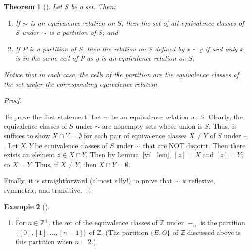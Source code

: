 \documentclass[10pt,]{book}
\theoremstyle{plain}
\newtheorem{theorem}{Theorem}[section]
\theoremstyle{definition}
\theoremstyle{definition}
\theoremstyle{definition}
\newtheorem{example}[theorem]{Example}
\theoremstyle{definition}
\numberwithin{equation}{section}
\def\Z{\mathbb{Z}}
\begin{document}
\begin{theorem}[{}]\label{part_quiv}
Let \(S\) be a set. Then: \leavevmode%
\begin{enumerate}
\item\hypertarget{li-405}{}If \(\sim\) is an equivalence relation on \(S\), then the set of all equivalence classes of \(S\) under \(\sim\) is a partition of \(S\); and%
\item\hypertarget{li-406}{}If \(P\) is a partition of \(S\), then the relation on \(S\) defined by \(x\sim y\) if and only \(x\) is in the same cell of \(P\) as \(y\) is an equivalence relation on \(S\).%
\end{enumerate}
%
\par
Notice that in each case, the cells of the partition are the equivalence classes of the set under the corresponding equivalence relation.%
\end{theorem}
\begin{proof}\hypertarget{proof-40}{}
To prove the first statement: Let \(\sim\) be an equivalence relation on \(S\). Clearly, the equivalence classes of \(S\) under \(\sim\) are nonempty sets whose union is \(S\). Thus, it suffices to show \(X
\cap Y =\emptyset\) for each pair of equivalence classes \(X\neq
Y\) of \(S\) under \(\sim\). Let \(X,Y\) be equivalence classes of \(S\) under \(\sim\) that are NOT disjoint. Then there exists an element \(z\in X\cap Y\). Then by \hyperref[vil_lem]{Lemma~\ref{vil_lem}}, \([z]=X\) and \([z]=Y\); so \(X=Y\). Thus, if \(X\neq Y\), then \(X\cap Y
=\emptyset\).%
\par
Finally, it is straightforward (almost silly!) to prove that \(\sim\) is reflexive, symmetric, and transitive.%
\end{proof}
\begin{example}[]\label{example-68}
\leavevmode%
\begin{enumerate}
\item\hypertarget{li-407}{}For \(n\in \Z^+\), the set of the equivalence classes of \(\Z\) under \(\equiv_n\) is the partition \(\{[0],[1],\ldots,[n-1]\}\) of \(\Z\). (The partition \(\{E
,O\}\) of \(\Z\) discussed above is this partition when \(n=2\).)%
\end{enumerate}
%
\end{example}
\typeout{************************************************}
\typeout{************************************************}
\end{document}

